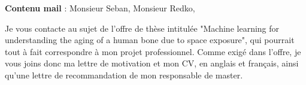 \documentclass[a4paper,12pt]{article}
\begin{document}
    

\textbf{Contenu mail} : Monsieur Seban, Monsieur Redko, 

Je vous contacte au sujet de l'offre de thèse intitulée "Machine learning for understanding the aging of a
human bone due to space exposure", qui pourrait tout à fait correspondre à mon projet professionnel. Comme exigé dans l'offre, je vous joins donc ma lettre de motivation et mon CV, en anglais et français, ainsi qu'une lettre de recommandation de mon responsable de master.%
\end{document}
